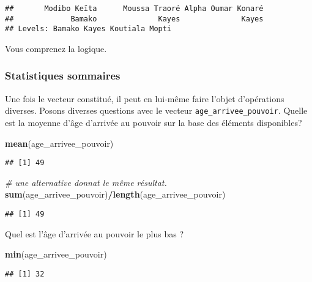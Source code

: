 \documentclass[]{book}
\newenvironment{Shaded}{\begin{snugshade}}{\end{snugshade}}
\newcommand{\KeywordTok}[1]{\textcolor[rgb]{0.13,0.29,0.53}{\textbf{#1}}}
\newcommand{\CommentTok}[1]{\textcolor[rgb]{0.56,0.35,0.01}{\textit{#1}}}
\newcommand{\OperatorTok}[1]{\textcolor[rgb]{0.81,0.36,0.00}{\textbf{#1}}}
\newcommand{\NormalTok}[1]{#1}
\begin{document}
\begin{verbatim}
##       Modibo Keïta      Moussa Traoré Alpha Oumar Konaré 
##             Bamako              Kayes              Kayes 
## Levels: Bamako Kayes Koutiala Mopti
\end{verbatim}

Vous comprenez la logique.

\subsubsection{Statistiques sommaires}\label{statistiques-sommaires}

Une fois le vecteur constitué, il peut en lui-même faire l'objet
d'opérations diverses. Posons diverses questions avec le vecteur
\texttt{age\_arrivee\_pouvoir}. Quelle est la moyenne d'âge d'arrivée au
pouvoir sur la base des éléments disponibles?

\begin{Shaded}
\begin{Highlighting}[]
\KeywordTok{mean}\NormalTok{(age_arrivee_pouvoir)}
\end{Highlighting}
\end{Shaded}

\begin{verbatim}
## [1] 49
\end{verbatim}

\begin{Shaded}
\begin{Highlighting}[]
\CommentTok{# une alternative donnat le même résultat.}
\KeywordTok{sum}\NormalTok{(age_arrivee_pouvoir)}\OperatorTok{/}\KeywordTok{length}\NormalTok{(age_arrivee_pouvoir)}
\end{Highlighting}
\end{Shaded}

\begin{verbatim}
## [1] 49
\end{verbatim}

Quel est l'âge d'arrivée au pouvoir le plus bas ?

\begin{Shaded}
\begin{Highlighting}[]
\KeywordTok{min}\NormalTok{(age_arrivee_pouvoir)}
\end{Highlighting}
\end{Shaded}

\begin{verbatim}
## [1] 32
\end{verbatim}
\end{document}
